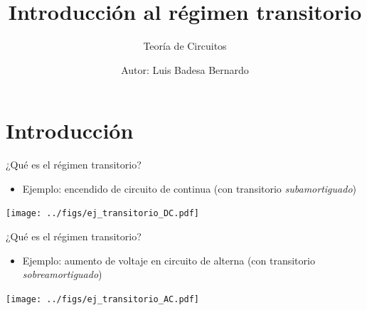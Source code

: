 \documentclass[aspectratio=169, usenames,svgnames,dvipsnames]{beamer}
\author{Autor: \hspace{2mm} Luis Badesa Bernardo}
\date{}
\title{Introducción al régimen transitorio \vspace{3mm}}
\subtitle{Teoría de Circuitos}
\begin{document}
\maketitle

\section{Introducción}

\begin{frame}{¿Qué es el régimen transitorio?} 
    \vspace{3mm}
    \begin{itemize}
        \item Ejemplo: \alert{encendido} de circuito de \alert{continua} (con transitorio \textit{subamortiguado})
    \end{itemize}

    \vspace{-2mm}
    \begin{center}
        \texttt{[image: ../figs/ej\_transitorio\_DC.pdf]}
    \end{center}
\end{frame}


\begin{frame}{¿Qué es el régimen transitorio?} 
    \vspace{3mm}
    \begin{itemize}
        \item Ejemplo: \alert{aumento de voltaje} en circuito de \alert{alterna} (con transitorio \textit{sobreamortiguado})
    \end{itemize}

    \vspace{-2mm}
    \begin{center}
        \texttt{[image: ../figs/ej\_transitorio\_AC.pdf]}
    \end{center}
\end{frame}

\end{document}
